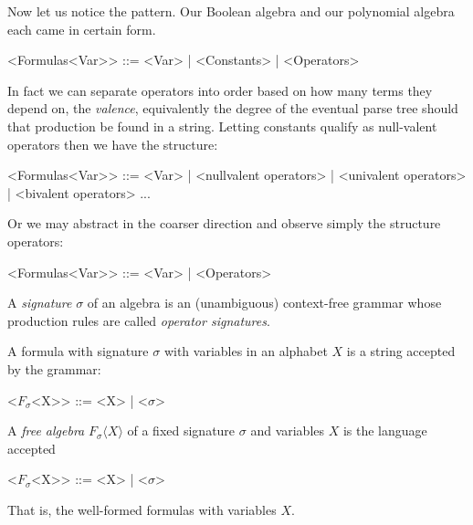 Now let us notice the pattern.  Our Boolean algebra and our polynomial algebra each 
came in certain form.
\begin{Gcode}[]
    <Formulas<Var>> ::= <Var>
            | <Constants>
            | <Operators>
\end{Gcode}
In fact we can separate operators into order based on how many terms they depend on,
the \emph{valence}, equivalently the degree of the eventual parse tree should that 
production be found in a string.  Letting constants qualify as null-valent operators 
then we have the structure:
\begin{Gcode}[]
    <Formulas<Var>> ::= <Var>
            | <nullvalent operators>
            | <univalent operators>
            | <bivalent operators>
            ...
\end{Gcode}
Or we may abstract in the coarser direction and observe simply the structure operators:
\begin{Gcode}[]
    <Formulas<Var>> ::= <Var>
                      | <Operators>
\end{Gcode}

\begin{definition}
    A \emph{signature} $\sigma$ of an algebra is an (unambiguous) context-free grammar 
    whose production rules are called \emph{operator signatures}.

    A formula with signature $\sigma$ with variables in an alphabet $X$
    is a string accepted by the grammar:
    \begin{Gcode}[]
        <$F_{\sigma}$<X>> ::= <X> | <$\sigma$>
    \end{Gcode}
\end{definition}


\begin{definition}
    A \emph{free algebra} $F_{\sigma}\langle X\rangle$ 
    of a fixed signature $\sigma$ and variables $X$
    is the language accepted 
    \begin{Gcode}[]
        <$F_{\sigma}$<X>> ::= <X> | <$\sigma$>
    \end{Gcode}
    That is, the well-formed formulas with variables $X$.
\end{definition}